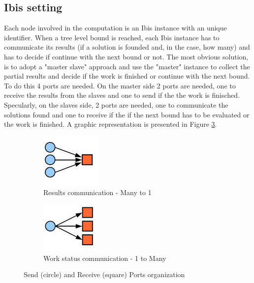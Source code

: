 \documentclass[a4paper]{article}
\begin{document}
\subsection{Ibis setting}
\label{sec:ibis_setting}
Each node involved in the computation is an Ibis instance with an unique identifier.
When a tree level bound is reached, each Ibis instance has to communicate its results (if a solution is founded and, in the case, how many) and has to decide if continue with the next bound or not. The most obvious solution, is to adopt a "master slave" approach and use the "master" instance to collect the partial results and decide if the work is finished or continue with the next bound. To do this 4 ports are needed. On the master side 2 ports are needed, one to receive the results from the slaves and one to send if the  the work is finisched. Specularly, on the slaves side, 2 ports are needed, one to communicate the solutions found and one to receive if the if the next bound has to be evaluated or the work is finished. A graphic representation is presented in Figure \ref{fig:ports}.

\begin{figure}
\begin{subfigure}{0.5\textwidth}
\includegraphics[width=0.5\linewidth]{results}
\caption{Results communication - Many to 1} \label{fig:ca}
\end{subfigure}
\hspace*{\fill} %
\begin{subfigure}{0.5\textwidth}
\includegraphics[width=0.5\linewidth]{continue}
\caption{Work status communication - 1 to Many} \label{fig:cb}
\end{subfigure}
\caption{Send (circle) and Receive (square) Ports organization} \label{fig:ports}
\end{figure}
\FloatBarrier










\printbibliography 
\end{document}
